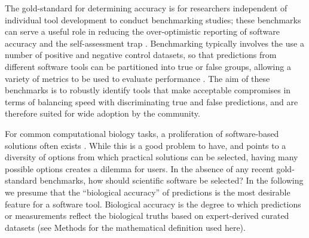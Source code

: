 \documentclass{bmcart}
\begin{document}
The gold-standard for determining accuracy is for researchers independent
of individual tool development to conduct benchmarking studies{\color{black};} these benchmarks can serve a useful role in
reducing the over-optimistic reporting of software accuracy
\cite{Boulesteix2010-te,Jelizarow2010-zf,Weber:2019} and the self-assessment trap
\cite{Norel2011-cq,Buchka:2021a}. Benchmarking typically involves the use a number of
positive and negative control datasets, so that predictions from different software tools can be
partitioned into true or false groups, allowing a variety of metrics to be
used to evaluate performance
\cite{Egan1975-nd,Hall2012-kg,Weber:2019}.
The aim of these benchmarks is to robustly identify tools that
make acceptable compromises in terms of balancing speed with
discriminating true and false predictions, and are therefore suited
for wide adoption by the community.

For common computational biology tasks, a proliferation of
software-based solutions often exists
\cite{Felsenstein1995-ic,Altschul2013-bv,Henry2014-ut}. While
this is a good problem to have, and points to a
diversity of options from which practical solutions can be selected,
having many possible options creates a dilemma for users. In the absence of
any recent gold-standard benchmarks, how should scientific software be
selected? In the following we presume that the ``biological
accuracy'' of predictions is the most desirable feature for a software tool. Biological
accuracy is the degree to which predictions or measurements reflect
the biological truths based on expert-derived curated datasets (see Methods for the  mathematical definition used here). 
\end{document}
